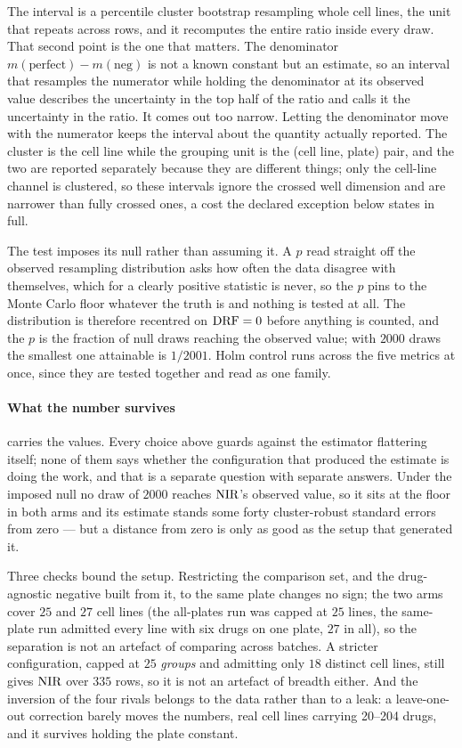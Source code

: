 The interval is a percentile cluster bootstrap resampling whole cell lines, the
unit that repeats across rows, and it recomputes the entire ratio inside every
draw. That second point is the one that matters. The denominator
$m(\textrm{perfect}) - m(\textrm{neg})$ is not a known constant but an estimate,
so an interval that resamples the numerator while holding the denominator at its
observed value describes the uncertainty in the top half of the ratio and calls
it the uncertainty in the ratio. It comes out too narrow. Letting the denominator
move with the numerator keeps the interval about the quantity actually reported.
The cluster is the cell line while the grouping unit is the (cell line, plate)
pair, and the two are reported separately because they are different things; only
the cell-line channel is clustered, so these intervals ignore the crossed well
dimension and are narrower than fully crossed ones, a cost the declared exception
below states in full.

The test imposes its null rather than assuming it. A $p$ read straight off the
observed resampling distribution asks how often the data disagree with
themselves, which for a clearly positive statistic is never, so the $p$ pins to
the Monte Carlo floor whatever the truth is and nothing is tested at all. The
distribution is therefore recentred on $\textrm{DRF} = 0$ before anything is counted, and
the $p$ is the fraction of null draws reaching the observed value; with
$\num{2000}$ draws the smallest one attainable is $1/2001$. Holm control runs
across the five metrics at once, since they are tested together and read as one
family.
\paragraph{What the number survives}  carries the values. Every
choice above guards against the estimator flattering itself; none of them says
whether the configuration that produced the estimate is doing the work, and that
is a separate question with separate answers. Under the imposed null no draw of
$\num{2000}$ reaches $\textrm{NIR}$'s observed value, so it sits at the floor in both
arms and its estimate stands some forty cluster-robust standard errors from zero
--- but a distance from zero is only as good as the setup that generated it.

Three checks bound the setup. Restricting the comparison set, and the drug-agnostic negative built from it, to the same plate changes no sign; the two arms cover $25$ and $27$ cell lines (the all-plates run was capped at $25$ lines, the same-plate run admitted every line with six drugs on one plate, $27$ in all), so the separation is not an artefact of comparing across batches. A stricter
configuration, capped at $25$ \emph{groups} and admitting only $18$ distinct cell
lines, still gives $\textrm{NIR}$  over $335$ rows, so it is
not an artefact of breadth either. And the inversion of the four rivals belongs
to the data rather than to a leak: a leave-one-out correction barely moves the
numbers, real cell lines carrying 20--204 drugs, and it survives holding the
plate constant.

